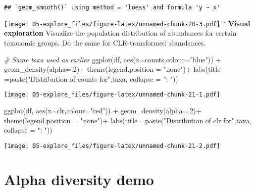 \documentclass[
  oneside]{book}
\newenvironment{Shaded}{\begin{snugshade}}{\end{snugshade}}
\newcommand{\AttributeTok}[1]{\textcolor[rgb]{0.77,0.63,0.00}{#1}}
\newcommand{\CommentTok}[1]{\textcolor[rgb]{0.56,0.35,0.01}{\textit{#1}}}
\newcommand{\DecValTok}[1]{\textcolor[rgb]{0.00,0.00,0.81}{#1}}
\newcommand{\FunctionTok}[1]{\textcolor[rgb]{0.00,0.00,0.00}{#1}}
\newcommand{\NormalTok}[1]{#1}
\newcommand{\SpecialCharTok}[1]{\textcolor[rgb]{0.00,0.00,0.00}{#1}}
\newcommand{\StringTok}[1]{\textcolor[rgb]{0.31,0.60,0.02}{#1}}
\begin{document}
\begin{verbatim}
## `geom_smooth()` using method = 'loess' and formula 'y ~ x'
\end{verbatim}

\texttt{[image: 05-explore\_files/figure-latex/unnamed-chunk-20-3.pdf]}
* \textbf{Visual exploration} Visualize the population distribution of
abundances for certain taxonomic groups. Do the same for
CLR-transformed abundances.

\begin{Shaded}
\begin{Highlighting}[]
\CommentTok{\# Same taxa used as earlier}
\FunctionTok{ggplot}\NormalTok{(df, }\FunctionTok{aes}\NormalTok{(}\AttributeTok{x=}\NormalTok{counts,}\AttributeTok{colour=}\StringTok{"blue"}\NormalTok{)) }\SpecialCharTok{+}
    \FunctionTok{geom\_density}\NormalTok{(}\AttributeTok{alpha=}\NormalTok{.}\DecValTok{2}\NormalTok{)}\SpecialCharTok{+}
  \FunctionTok{theme}\NormalTok{(}\AttributeTok{legend.position =} \StringTok{"none"}\NormalTok{)}\SpecialCharTok{+}
  \FunctionTok{labs}\NormalTok{(}\AttributeTok{title =}\FunctionTok{paste}\NormalTok{(}\StringTok{"Distribution of counts for"}\NormalTok{,taxa, }\AttributeTok{collapse =} \StringTok{": "}\NormalTok{))}
\end{Highlighting}
\end{Shaded}

\texttt{[image: 05-explore\_files/figure-latex/unnamed-chunk-21-1.pdf]}

\begin{Shaded}
\begin{Highlighting}[]
\FunctionTok{ggplot}\NormalTok{(df, }\FunctionTok{aes}\NormalTok{(}\AttributeTok{x=}\NormalTok{clr,}\AttributeTok{colour=}\StringTok{"red"}\NormalTok{)) }\SpecialCharTok{+} 
    \FunctionTok{geom\_density}\NormalTok{(}\AttributeTok{alpha=}\NormalTok{.}\DecValTok{2}\NormalTok{)}\SpecialCharTok{+}
  \FunctionTok{theme}\NormalTok{(}\AttributeTok{legend.position =} \StringTok{"none"}\NormalTok{)}\SpecialCharTok{+}
  \FunctionTok{labs}\NormalTok{(}\AttributeTok{title =}\FunctionTok{paste}\NormalTok{(}\StringTok{"Distribution of clr for"}\NormalTok{,taxa, }\AttributeTok{collapse =} \StringTok{": "}\NormalTok{))}
\end{Highlighting}
\end{Shaded}

\texttt{[image: 05-explore\_files/figure-latex/unnamed-chunk-21-2.pdf]}

\hypertarget{alpha-diversity-demo}{%
\chapter{Alpha diversity demo}\label{alpha-diversity-demo}}
\end{document}
